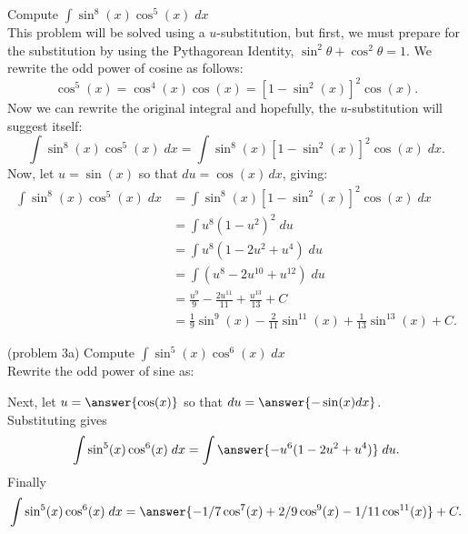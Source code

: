 \documentclass{ximera}
\begin{document}
\begin{example}[example 3]
Compute $\displaystyle{\int \sin^8(x)\cos^5(x) \; dx}$\\
This problem will be solved using a $u$-substitution, but first, we must
prepare for the substitution by using the Pythagorean 
Identity, $\sin^2 \theta + \cos^2 \theta = 1$. We rewrite the odd power of cosine as follows:
\[
\cos^5(x) = \cos^4(x) \cos(x) = \left[1 - \sin^2(x)\right]^2 \cos(x).
\]
Now we can rewrite the original integral and hopefully, the $u$-substitution will suggest itself:
\[
\int \sin^8(x)\cos^5(x) \; dx = \int \sin^8(x)\left[1 - \sin^2(x)\right]^2 \cos(x) \; dx.
\]
Now, let $u = \sin(x)$ so that  $du = \cos(x) \, dx$, giving:
\begin{align*}
\int \sin^8(x)\cos^5(x) \; dx &= \int \sin^8(x)\left[1 - \sin^2(x)\right]^2 \cos(x) \; dx\\
   &= \int u^8 (1-u^2)^2 \; du\\
   &= \int u^8 (1-2u^2 + u^4) \; du\\
   &= \int (u^8 -2u^{10} + u^{12}) \; du\\
  &= \frac{u^9}{9} - \frac{2u^{11}}{11} + \frac{u^{13}}{13} + C \\
  &= \frac19 \sin^9(x) - \frac{2}{11} \sin^{11}(x)  + \frac{1}{13} \sin^{13}(x) + C.
\end{align*}
  
\end{example}




\begin{problem}{\color{gray}(problem 3a)} Compute $\displaystyle{\int \sin^5(x)\cos^6(x) \; dx}$\\
Rewrite the odd power of sine as:
\begin{multipleChoice}

\end{multipleChoice}

Next, let $u = \answer{\cos(x)}$ so that $du = \answer{-\sin(x) dx}$.\\
Substituting gives
\[
\int \sin^5(x)\cos^6(x) \; dx= \int \answer{-u^6(1-2u^2 + u^4)} \; du.
\]
Finally
\[
\int \sin^5(x)\cos^6(x) \; dx= \answer{-1/7 \cos^7(x) + 2/9 \cos^9(x) - 1/11 \cos^{11}(x)} + C.
\]
\end{problem}
\end{document}

